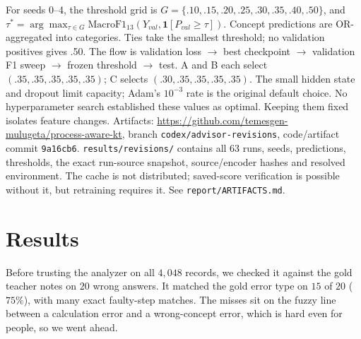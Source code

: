 \documentclass[11pt]{article}
\newcommand{\code}[1]{\texttt{\small #1}}
\begin{document}
For seeds 0--4, the threshold grid is
$G=\{.10,.15,.20,.25,.30,.35,.40,.50\}$, and
$\tau^*=\arg\max_{\tau\in G}\mathrm{MacroF1}_{13}(Y_{val},\mathbf1[P_{val}\geq\tau])$.
Concept predictions are OR-aggregated into categories. Ties take the smallest
threshold; no validation positives gives .50. The flow is validation loss $\to$
best checkpoint $\to$ validation F1 sweep $\to$ frozen threshold $\to$ test.
A and B each select $(.35,.35,.35,.35,.35)$; C selects $(.30,.35,.35,.35,.35)$.
The small hidden state and dropout limit capacity; Adam's $10^{-3}$ rate is the
original default choice. No hyperparameter search established these values as
optimal. Keeping them fixed isolates feature changes. Artifacts:
\url{https://github.com/temesgen-mulugeta/process-aware-kt}, branch
\code{codex/advisor-revisions}, code/artifact commit \code{9a16cb6}.
\code{results/revisions/} contains all 63 runs, seeds, predictions, thresholds,
the exact run-source snapshot, source/encoder hashes and resolved environment.
The cache is not distributed; saved-score verification is possible without it,
but retraining requires it. See \code{report/ARTIFACTS.md}.


\section{Results}
Before trusting the analyzer on all $4{,}048$ records, we checked it against the gold
teacher notes on $20$ wrong answers. It matched the gold error type on $15$ of $20$
($75\%$), with many exact faulty-step matches. The misses sit on the fuzzy line between
a calculation error and a wrong-concept error, which is hard even for people, so we
went ahead.
\end{document}
